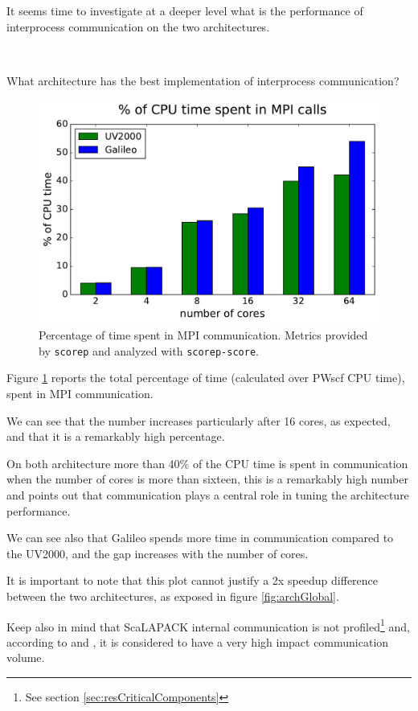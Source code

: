 \documentclass[a4paper,12pt]{article}
\begin{document}
It seems time to investigate at a deeper level what is the performance of interprocess communication on the two architectures.

\newpage
~
\newpage

\begin{center}
\begin{framed}
What architecture has the best implementation of interprocess communication?
\end{framed}
\end{center}



\begin{figure}[hhh!]
\centerline{ \includegraphics[width=0.7\linewidth]{arch_mpi_perc.pdf}	}
	\caption{Percentage of time spent in MPI communication. Metrics provided by \texttt{scorep} and analyzed with \texttt{scorep-score}.}
	\label{fig:archMpiPerc}
\end{figure}


Figure \ref{fig:archMpiPerc} reports the total percentage of time (calculated over PWscf CPU time), spent in MPI communication.

We can see that the number increases particularly after 16 cores, as expected, and that it is a remarkably high percentage.

On both architecture more than 40\% of the CPU time is spent in communication when the number of cores is more than sixteen, this is a remarkably high number and points out that communication plays a central role in tuning the architecture performance.

We can see also that Galileo spends more time in communication compared to the UV2000, and the gap increases with the number of cores.

It is important to note that this plot cannot justify a 2x speedup difference between the two architectures, as exposed in figure \ref{fig:archGlobal}.

Keep also in mind that ScaLAPACK internal communication is not profiled\footnote{See section \ref{sec:resCriticalComponents}} and, according to \cite{QE} and \cite {QE2}, it is considered to have a very high impact communication volume.
\end{document}
